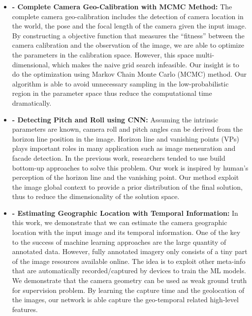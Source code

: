 \begin{itemize}[noitemsep]

  \item \textbf{ - 
  Complete Camera Geo-Calibration with MCMC Method:} \newline \newline
  The complete camera geo-calibration includes the detection of camera
  location in the world, the pose and the focal length of the camera
  given the input image. By constructing a objective function that
  measures the ``fitness'' between the camera calibration and the
  observation of the image, we are able to optimize the parameters in
  the calibration space. However, this space multi-dimensional, which
  makes the naive grid search infeasible. Our insight is to do the
  optimization using Markov Chain Monte Carlo (MCMC) method. Our
  algorithm is able to avoid unnecessary sampling in the
  low-probabilistic region in the parameter space thus reduce the
  computational time dramatically. \newline

  \item \textbf{ -
  Detecting Pitch and Roll using CNN:} \newline \newline
  Assuming the intrinsic parameters are known, camera roll and pitch
  angles can be derived from the horizon line position in the image.
  Horizon line and vanishing points (VPs) plays important roles in many
  application such as image mensuration and facade detection. In the
  previous work, researchers tended to use build bottom-up approaches to
  solve this problem. Our work is inspired by human's perception of the
  horizon line and the vanishing point. Our method exploit the image
  global context to provide a prior distribution of the final solution,
  thus to reduce the dimensionality of the solution space. \newline

  \item \textbf{ -
  Estimating Geographic Location with Temporal Information:} \newline \newline
  In this work, we demonstrate that we can estimate the camera geographic
  location with the input image and its temporal information.
  One of the key to the success of machine learning approaches are the
  large quantity of annotated data. However, fully annotated imagery
  only consists of a tiny part of the image resources available online.
  The idea is to exploit other meta-info that are automatically
  recorded/captured by devices to train the ML models. We demonstrate
  that the camera geometry can be used as weak ground truth for
  supervision problem. By learning the capture time and the geolocation
  of the images, our network is able capture the geo-temporal related
  high-level features. \newline


\end{itemize}
